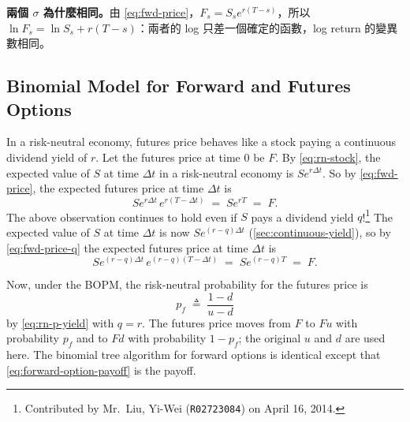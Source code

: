 \suppstart
{}

\begin{remark}
	\textbf{兩個 $\sigma$ 為什麼相同。}由 \eqref{eq:fwd-price}，$F_{s}=S_{s}e^{r(T-s)}$，所以 $\ln F_{s}=\ln S_{s}+r(T-s)$：兩者的 log 只差一個確定的函數，log return 的變異數相同。
\end{remark}
\suppend

\subsection{Binomial Model for Forward and Futures Options}
\label{sec:futures-bopm}


In a risk-neutral economy, futures price behaves like a stock paying a continuous dividend yield of $r$.
Let the futures price at time $0$ be $F$.
By \eqref{eq:rn-stock}, the expected value of $S$ at time $\Delta t$ in a risk-neutral economy is $Se^{r\Delta t}$.
So by \eqref{eq:fwd-price}, the expected futures price at time $\Delta t$ is
\[
	Se^{r\Delta t}\,e^{r(T-\Delta t)} \;=\; Se^{rT} \;=\; F .
\]
The above observation continues to hold even if $S$ pays a dividend yield $q$!\footnote{Contributed by Mr.~Liu, Yi-Wei (\texttt{R02723084}) on April 16, 2014.}
The expected value of $S$ at time $\Delta t$ is now $Se^{(r-q)\Delta t}$ (\autoref{sec:continuous-yield}), so by \eqref{eq:fwd-price-q} the expected futures price at time $\Delta t$ is
\[
	Se^{(r-q)\Delta t}\,e^{(r-q)(T-\Delta t)} \;=\; Se^{(r-q)T} \;=\; F .
\]

\suppstart
{}
\suppend

Now, under the BOPM, the risk-neutral probability for the futures price is
\begin{equation}
	p_{f} \;\triangleq\; \frac{1-d}{u-d}
	\label{eq:pf}
\end{equation}
by \eqref{eq:rn-p-yield} with $q=r$.
The futures price moves from $F$ to $Fu$ with probability $p_{f}$ and to $Fd$ with probability $1-p_{f}$; the original $u$ and $d$ are used here.
The binomial tree algorithm for forward options is identical except that \eqref{eq:forward-option-payoff} is the payoff.

